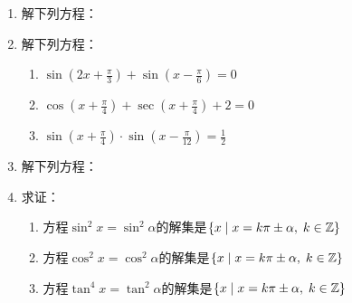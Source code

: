 \begin{enumerate}
    \item 解下列方程：
\begin{enumerate}[(1)]
\end{enumerate}

\item 解下列方程：
\begin{enumerate}[(1)]
    \item $\sin\left(2x+\frac{\pi}{3}\right)+\sin\left(x-\frac{\pi}{6}\right)=0$
    \item $\cos\left(x+\frac{\pi}{4}\right)+\sec\left(x+\frac{\pi}{4}\right)+2=0$
    \item $\sin\left(x+\frac{\pi}{4}\right)\cdot \sin\left(x-\frac{\pi}{12}\right)=\frac{1}{2}$   

\end{enumerate}

\item 解下列方程：
\begin{enumerate}[(1)]
\end{enumerate}

\item 求证：
\begin{enumerate}[(1)]
\item 方程$\sin^2x=\sin^2\alpha$的解集是$\{x\mid x=k\pi\pm\alpha,\; k\in \mathbb{Z}\}$ 
\item 方程$\cos^2x=\cos^2\alpha$的解集是$\left\{x\mid x=k\pi\pm \alpha,\; k\in\mathbb{Z}\right\}$
\item 方程$\tan^{4}x=\tan^{2}\alpha$的解集是$\{x\mid x=k\pi\pm \alpha,\; k\in \mathbb{Z}\}$
\end{enumerate}


\end{enumerate}
